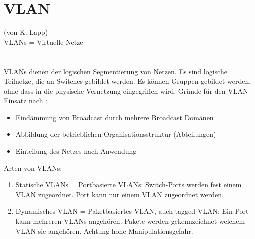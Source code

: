 \section*{VLAN}
(von K. Lapp)\\

VLANs = Virtuelle Netze \\
\cite[S.167-169]{zisler2018computer} \\
\cite{bsiLogSeg}\\

VLANs dienen der logischen Segmentierung von Netzen. Es sind logische Teilnetze, die an Switches gebildet werden. Es können Gruppen gebildet werden, ohne dass in die physische Vernetzung eingegriffen wird.
Gründe für den VLAN Einsatz nach \cite[S.167]{zisler2018computer}:
\begin{itemize}
  \item Eindämmung von Broadcast durch mehrere Broadcast Domänen
  \item Abbildung der betrieblichen Organisationsstruktur (Abteilungen)
  \item Einteilung des Netzes nach Anwendung 
\end{itemize}



Arten von VLANs: 
\begin{enumerate}
  \item Statische VLANs = Portbasierte VLANs: Switch-Ports werden fest einem VLAN zugeordnet. Port kann nur einem VLAN zugeordnet werden. 
  \item Dynamisches VLAN = Paketbasiertes VLAN, auch tagged VLAN: Ein Port kann mehreren VLANs angehören. Pakete werden gekennzeichnet welchem VLAN sie angehören. Achtung hohe Manipulationsgefahr. 
\end{enumerate}

